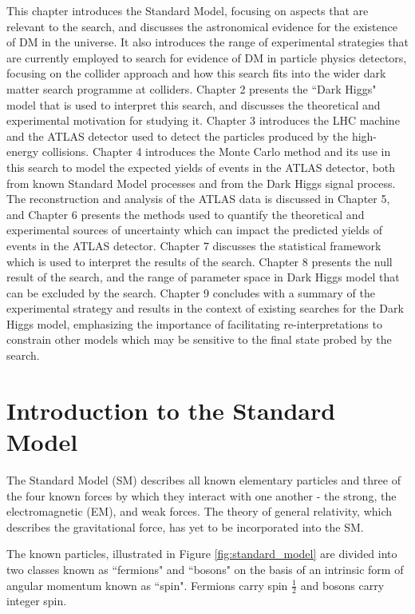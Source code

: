 This chapter introduces the Standard Model, focusing on aspects that are relevant to the search, and discusses the astronomical evidence for the existence of DM in the universe. It also introduces the range of experimental strategies that are currently employed to search for evidence of DM in particle physics detectors, focusing on the collider approach and how this search fits into the wider dark matter search programme at colliders. Chapter 2 presents the ``Dark Higgs" model that is used to interpret this search, and discusses the theoretical and experimental motivation for studying it. Chapter 3 introduces the LHC machine and the ATLAS detector used to detect the particles produced by the high-energy collisions. Chapter 4 introduces the Monte Carlo method and its use in this search to model the expected yields of events in the ATLAS detector, both from known Standard Model processes and from the Dark Higgs signal process. The reconstruction and analysis of the ATLAS data is discussed in Chapter 5, and Chapter 6 presents the methods used to quantify the theoretical and experimental sources of uncertainty which can impact the predicted yields of events in the ATLAS detector. Chapter 7 discusses the statistical framework which is used to interpret the results of the search. Chapter 8 presents the null result of the search, and the range of parameter space in Dark Higgs model that can be excluded by the search. Chapter 9 concludes with a summary of the experimental strategy and results in the context of existing searches for the Dark Higgs model, emphasizing the importance of facilitating re-interpretations to constrain other models which may be sensitive to the final state probed by the search. 

\section{Introduction to the Standard Model}

The Standard Model (SM) describes all known elementary particles and three of the four known forces by which they interact with one another - the strong, the electromagnetic (EM), and weak forces. The theory of general relativity, which describes the gravitational force, has yet to be incorporated into the SM. 

The known particles, illustrated in Figure \ref{fig:standard_model} are divided into two classes known as ``fermions" and ``bosons" on the basis of an intrinsic form of angular momentum known as ``spin". Fermions carry spin \(\frac{1}{2}\) and bosons carry integer spin. 

